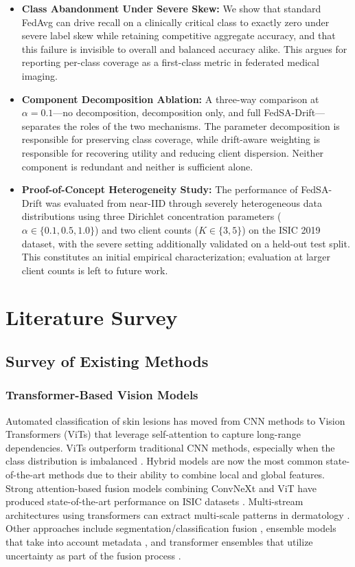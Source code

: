\documentclass[utf8]{FrontiersinHarvard} %
\newcommand{\sadrift}{FedSA-Drift}
\begin{document}
\begin{itemize}
    \item \textbf{Class Abandonment Under Severe Skew:} We show that standard FedAvg can drive recall on a clinically critical class to exactly zero under severe label skew while retaining competitive aggregate accuracy, and that this failure is invisible to overall and balanced accuracy alike. This argues for reporting per-class coverage as a first-class metric in federated medical imaging.
    \item \textbf{Component Decomposition Ablation:} A three-way comparison at $\alpha = 0.1$---no decomposition, decomposition only, and full \sadrift{}---separates the roles of the two mechanisms. The parameter decomposition is responsible for preserving class coverage, while drift-aware weighting is responsible for recovering utility and reducing client dispersion. Neither component is redundant and neither is sufficient alone.
    \item \textbf{Proof-of-Concept Heterogeneity Study:} The performance of \sadrift{} was evaluated from near-IID through severely heterogeneous data distributions using three Dirichlet concentration parameters ($\alpha \in \{0.1, 0.5, 1.0\}$) and two client counts ($K \in \{3, 5\}$) on the ISIC 2019 dataset, with the severe setting additionally validated on a held-out test split. This constitutes an initial empirical characterization; evaluation at larger client counts is left to future work.


\end{itemize}

\section{Literature Survey}
\subsection{Survey of Existing Methods}
\subsubsection{Transformer-Based Vision Models}
Automated classification of skin lesions has moved from CNN methods to Vision Transformers (ViTs) that leverage self-attention to capture long-range dependencies. ViTs outperform traditional CNN methods, especially when the class distribution is imbalanced \citep{Aguirre2024}. Hybrid models are now the most common state-of-the-art methods due to their ability to combine local and global features. Strong attention-based fusion models combining ConvNeXt and ViT have produced state-of-the-art performance on ISIC datasets \citep{Naeem2025}. Multi-stream architectures using transformers can extract multi-scale patterns in dermatology \citep{Alshdaifat2025}. Other approaches include segmentation/classification fusion \citep{HyperFusionNet2025}, ensemble models that take into account metadata \citep{HasanRifat2024}, and transformer ensembles that utilize uncertainty as part of the fusion process \citep{Zoravar2024}.
\end{document}
